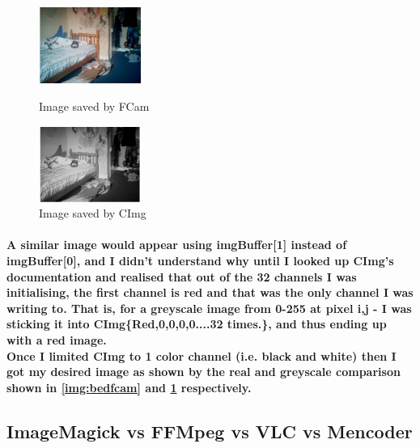 \begin{figure}
	\vspace{-200pt}
	\begin{center}
		\includegraphics[width=0.3\textwidth]{../images/realbuffer2}
	\end{center}
	\vspace{-20pt}
	\caption{Image saved by FCam}\label{img:bedfcam}
	\vspace{0pt}
	\begin{center}
		\includegraphics[width=0.3\textwidth]{../images/blackbuffer3}
	\end{center}
	\vspace{-20pt}
	\caption{Image saved by CImg}\label{img:bedcimg}
	\vspace{-10pt}
\end{figure}
\paragraph{
A similar image would appear using imgBuffer[1] instead of imgBuffer[0], and I didn't understand why until I looked up CImg's documentation and realised that out of the 32 channels I was initialising, the first channel is red and that was the only channel I was writing to.
That is, for a greyscale image from 0-255 at pixel i,j - I was sticking it into CImg\{Red,0,0,0,0....32 times.\}, and thus ending up with a red image.
\\Once I limited CImg to 1 color channel (i.e. black and white) then I got my desired image as shown by the real and greyscale comparison shown in \cref{img:bedfcam} and \cref{img:bedcimg} respectively.
}


\subsection{ImageMagick vs FFMpeg vs VLC vs Mencoder}
